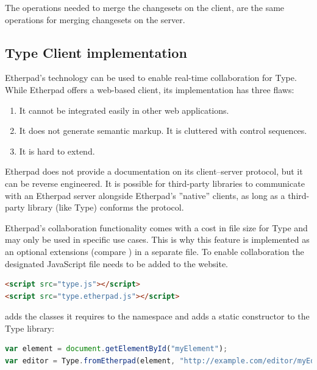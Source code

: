 The operations needed to merge the changesets on the client, are the same operations for merging changesets on the server.

\subsection{Type Client implementation}
\label{subsec:etherpad_type_client_implementation}

Etherpad's technology can be used to enable real-time collaboration for Type. While Etherpad offers a web-based client, its implementation has three flaws:

\begin{enumerate}
\item It cannot be integrated easily in other web applications.
\item It does not generate semantic markup. It is cluttered with control sequences.
\item It is hard to extend.
\end{enumerate}

Etherpad does not provide a documentation on its client--server protocol, but it can be reverse engineered. It is possible for third-party libraries to communicate with an Etherpad server alongside Etherpad's ''native'' clients, as long as a third-party library (like Type) conforms the protocol.

Etherpad's collaboration functionality comes with a cost in file size for Type and may only be used in specific use cases. This is why this feature is implemented as an optional extensions (compare ) in a separate file. To enable collaboration the designated JavaScript file needs to be added to the website.

\begin{lstlisting}[language=html, caption=Enabling real-time collaboration to Type, label=lst:add_etherpad_html]
<script src="type.js"></script>
<script src="type.etherpad.js"></script>
\end{lstlisting}

 adds the classes it requires to the  namespace and adds a static constructor to the Type library:

\begin{lstlisting}[language=JavaScript, caption=Static constructor to generate a collaborative Type instance, label=lst:etherpad_constructor]
var element = document.getElementById("myElement");
var editor = Type.fromEtherpad(element, "http://example.com/editor/myEditorId");
\end{lstlisting}

